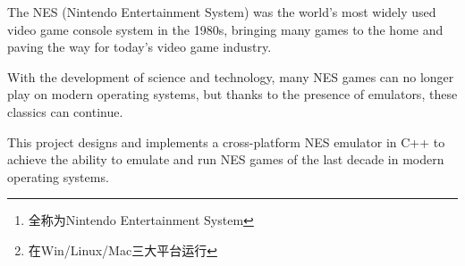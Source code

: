 \documentclass[a4paper]{ltxdoc}
\begin{document}





\begin{abstract}
	NES\footnote{全称为Nintendo Entertainment System}(任天堂娱乐系统)在20世纪80年代是世界上使用最广泛的电子游戏系统，将许多游戏带入了家庭，并为当今电子游戏产业铺平了道路。

	随着科技的发展，许多NES游戏已经无法在当今系统上游玩，然而归功于模拟器的存在，使得这些经典能够延续下去。

	本课题设计并用C++实现一个跨平台\footnote{在Win/Linux/Mac三大平台运行}的NES模拟器，以达到在现代操作系统中能够模拟并运行上个年代的NES游戏。

\end{abstract}

\begin{abstractEn}
	The NES (Nintendo Entertainment System) was the world's most widely used video game console system in the 1980s, bringing many games to the home and paving the way for today's video game industry.

	With the development of science and technology, many NES games can no longer play on modern operating systems, but thanks to the presence of emulators, these classics can continue.

	This project designs and implements a cross-platform NES emulator in C++ to achieve the ability to emulate and run NES games of the last decade in modern operating systems.

\end{abstractEn}

{
\setlength{\cftfignumwidth}{3.5em}
\setlength{\cfttabnumwidth}{3.5em}
\clearpage
\tableofcontents
{}

\clearpage
\listoffigures

\clearpage
\listoftables

}

\fancyhead{}
\pagestyle{fancy}
\end{document}
